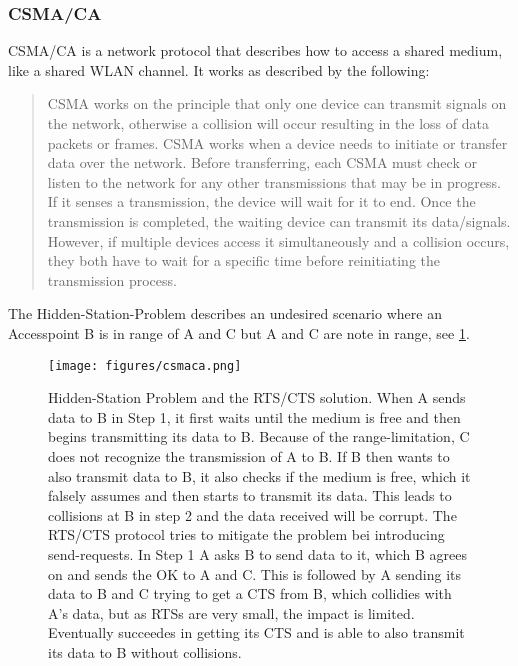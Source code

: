       \subsubsection{\ac{CSMA/CA}}
	\ac{CSMA/CA} is a network protocol that describes how to access a shared medium, like a shared WLAN channel.
	It works as described by the following:
	\begin{quotation}
	  CSMA works on the principle that only one device can transmit signals on the network, 
	  otherwise a collision will occur resulting in the loss of data packets or frames. 
	  CSMA works when a device needs to initiate or transfer data over the network. 
	  Before transferring, each CSMA must check or listen to the network for any other transmissions that may be in progress. 
	  If it senses a transmission, the device will wait for it to end. Once the transmission is completed, 
	  the waiting device can transmit its data/signals. However, if multiple devices access it simultaneously and a collision occurs, 
	  they both have to wait for a specific time before reinitiating the transmission process. 
	\end{quotation} \cite{csma_techo}
	
	The Hidden-Station-Problem describes an undesired scenario where an Accesspoint B is in range of A and C but A and C are note in range, see \ref{fig:csmaca}.
	
	\begin{figure}[th!]
	  \centering
	  \texttt{[image: figures/csmaca.png]}
	  \caption{Hidden-Station Problem and the RTS/CTS solution. When A sends data to B in Step 1, 
	    it first waits until the medium is free and then begins transmitting its data to B. 
	    Because of the range-limitation, C does not recognize the transmission of A to B. 
	    If B then wants to also transmit data to B, it also checks if the medium is free, which it falsely assumes
	    and then starts to transmit its data. This leads to collisions at B in step 2 and the data received will be corrupt.
	    The RTS/CTS protocol tries to mitigate the problem bei introducing send-requests. In Step 1 A asks B to send data to it, which B agrees on and sends the OK to
	    A and C. This is followed by A sending its data to B and C trying to get a CTS from B, which collidies with A's data, but as RTSs are very small, the impact
	    is limited. Eventually succeedes in getting its CTS and is able to also transmit its data to B without collisions.}
	  \label{fig:csmaca}
	\end{figure}

